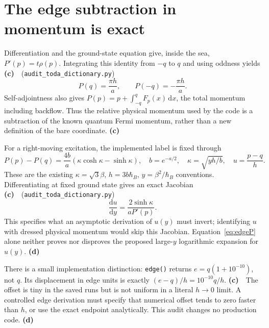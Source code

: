 \documentclass[11pt,a4paper]{article}
\newcommand{\Lc}{\textbf{(c)}\ }
\newcommand{\Ld}{\textbf{(d)}\ }
\newcommand{\scr}{\texttt{audit\_\allowbreak toda\_\allowbreak dictionary.py}}
\newcommand{\dd}{\mathrm d}
\begin{document}
\section{The edge subtraction in momentum is exact}
Differentiation and the ground-state equation give, inside the sea,
$P'(p)=t\rho(p)$. Integrating this identity from $-q$ to $q$ and using
oddness yields \Lc\ (\scr)
\begin{equation}
 \boxed{P(q)=\frac{\pi h}{a},\qquad P(-q)=-\frac{\pi h}{a}.}
 \label{eq:edgeP}
\end{equation}
Self-adjointness also gives
$P(p)=p+\int_{-q}^q F_p(x)\,\dd x$, the total momentum including backflow.
Thus the relative physical momentum used by the code is a subtraction of
the known quantum Fermi momentum, rather than a new definition of the bare
coordinate. \Lc

For a right-moving excitation, the implemented label is fixed through
\begin{equation}
 P(p)-P(q)=\frac{4b}{a}(\kappa\cosh\kappa-\sinh\kappa),\quad
 b=e^{-a/2},\quad \kappa=\sqrt{yh/b},\quad u=\frac{p-q}{h}.
 \label{eq:dictionary}
\end{equation}
These are the existing $\kappa=\sqrt3\beta$,
$h=3b\hbar_B$, $y=\beta^2/\hbar_B$ conventions. Differentiating at fixed
ground state gives an exact Jacobian \Lc\ (\scr)
\begin{equation}
 \frac{\dd u}{\dd y}=\frac{2\sinh\kappa}{aP'(p)}.
 \label{eq:Jacobian}
\end{equation}
This specifies what an asymptotic derivation of $u(y)$ must invert;
identifying $u$ with dressed physical momentum would skip this Jacobian.
Equation~\eqref{eq:edgeP} alone neither proves nor disproves the proposed
large-$y$ logarithmic expansion for $u(y)$. \Ld

There is a small implementation distinction: \texttt{edge()} returns
$e=q(1+10^{-10})$, not $q$. Its displacement in edge units is exactly
$(e-q)/h=10^{-10}q/h$. \Lc\ The offset is tiny in the saved runs but is
not uniform in a literal $h\to0$ limit. A controlled edge derivation must
specify that numerical offset tends to zero faster than $h$, or use the
exact endpoint analytically. This audit changes no production code. \Ld
\end{document}
